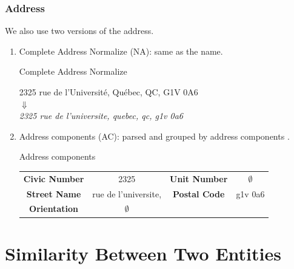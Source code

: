 \documentclass{beamer}
\begin{document}
	\begin{frame}[label=pretraitement-adresse]\frametitle{Address} 
		We also use two versions of the address.
		\begin{enumerate}
			\item<1-> Complete Address Normalize (NA): same as the name.
			\begin{block}{Complete Address Normalize}
				\begin{center}
					2325 rue de l'Université, Québec, QC, G1V 0A6 \\ $\Downarrow$ \\ \textit{2325 rue de l'universite, quebec, qc, g1v 0a6}
				\end{center}
			\end{block}
			\item<2-> Address components (AC): parsed and grouped by address components \cite{yassine2020leveraging}.
			\begin{block}{Address components}
				\begin{center}
					\scriptsize
					\begin{tabular}{cccc}
						\textbf{Civic Number} & 2325                 & \textbf{Unit Number} & $\emptyset$ \\
						\textbf{Street Name}  & rue de l'universite, & \textbf{Postal Code}    & g1v 0a6\\
						\textbf{Orientation}    & $\emptyset$                & &     \\
					\end{tabular}
				\end{center}
			\end{block}
		\end{enumerate}
	\end{frame}
	
	\section{Similarity Between Two Entities}
	
\end{document}

